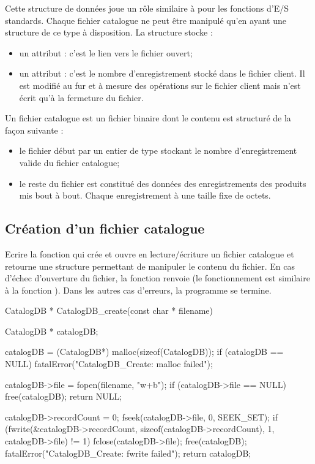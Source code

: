 Cette structure de données joue un rôle similaire à  pour les fonctions d'E/S standards. Chaque fichier catalogue ne peut être manipulé qu'en ayant une structure de ce type à disposition. La structure stocke :
\begin{itemize}
  \item un attribut  : c'est le lien vers le fichier ouvert;
  \item un attribut  : c'est le nombre d'enregistrement stocké dans le fichier client. Il est modifié au fur et à mesure des opérations sur le fichier client mais n'est écrit qu'à la fermeture du fichier.
\end{itemize}

Un fichier catalogue est un fichier binaire dont le contenu est structuré de la façon suivante :
\begin{itemize}
  \item le fichier début par un entier de type  stockant le nombre d'enregistrement valide du fichier catalogue;
  \item le reste du fichier est constitué des données des enregistrements des produits mis bout à bout. Chaque enregistrement à une taille fixe de  octets.
\end{itemize}

\subsection{Création d'un fichier catalogue}

Ecrire la fonction  qui crée et ouvre en lecture/écriture un fichier catalogue et retourne une structure permettant de manipuler le contenu du fichier. En cas d'échec d'ouverture du fichier, la fonction renvoie  (le fonctionnement est similaire à la fonction ). Dans les autres cas d'erreurs, la programme se termine.

\begin{csourcecorrection}
CatalogDB * CatalogDB_create(const char * filename) {
    CatalogDB * catalogDB;

    catalogDB = (CatalogDB*) malloc(sizeof(CatalogDB));
    if (catalogDB == NULL)
        fatalError("CatalogDB_Create: malloc failed");

    catalogDB->file = fopen(filename, "w+b");
    if (catalogDB->file == NULL) {
        free(catalogDB);
        return NULL;
    }

    catalogDB->recordCount = 0;
    fseek(catalogDB->file, 0, SEEK_SET);
    if (fwrite(&catalogDB->recordCount, sizeof(catalogDB->recordCount), 1, catalogDB->file) != 1) {
        fclose(catalogDB->file);
        free(catalogDB);
        fatalError("CatalogDB_Create: fwrite failed");
    }
    return catalogDB;
}
\end{csourcecorrection}


